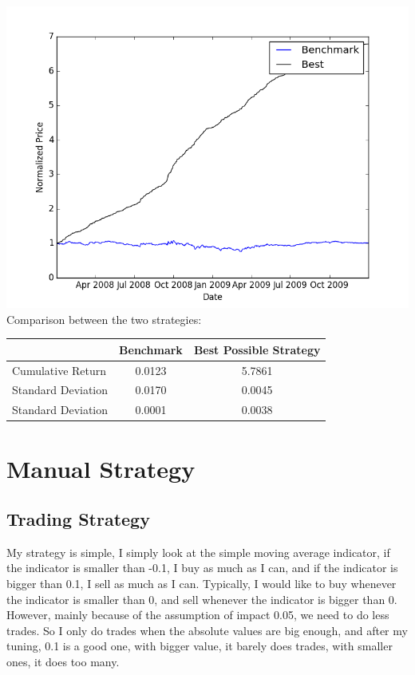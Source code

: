 \documentclass[a4paper]{article}
\begin{document}
	\includegraphics[width=\textwidth]{figure_1}
	Comparison between the two strategies:
	\begin{center}
  	\begin{tabular}{ | l | c | c |}
    \hline
     					& Benchmark & Best Possible Strategy \\ \hline
    Cumulative Return   & 0.0123 & 5.7861 \\ \hline
    Standard Deviation  & 0.0170 & 0.0045 \\ \hline
	Standard Deviation  & 0.0001 & 0.0038 \\ \hline

  \end{tabular}
\end{center}

\section{Manual Strategy}
\subsection{Trading Strategy}
	My strategy is simple, I simply look at the simple moving average indicator,
	if the indicator is smaller than -0.1, I buy as much as I can, and if the indicator
	is bigger than 0.1, I sell as much as I can. Typically, I would like to buy whenever
	the indicator is smaller than 0, and sell whenever the indicator is bigger than 0.
	However, mainly because of the assumption of impact 0.05, we need to do less trades.
	So I only do trades when the absolute values are big enough, and after my tuning, 0.1
	is a good one, with bigger value, it barely does trades, with smaller ones, it does too many.
\end{document}
